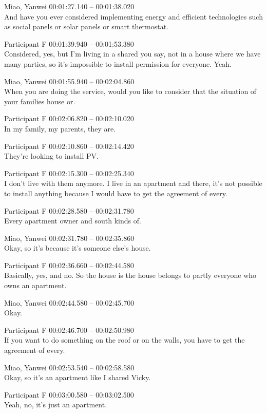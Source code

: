 {Miao, Yanwei 00:01:27.140 -- 00:01:38.020 \\
And have you ever considered implementing energy and efficient technologies such as social panels or solar panels or smart thermostat.

Participant F 00:01:39.940 -- 00:01:53.380 \\
Considered, yes, but I'm living in a shared you say, not in a house where we have many parties, so it's impossible to install permission for everyone. Yeah.

Miao, Yanwei 00:01:55.940 -- 00:02:04.860 \\
When you are doing the service, would you like to consider that the situation of your families house or.

Participant F 00:02:06.820 -- 00:02:10.020 \\
In my family, my parents, they are.

Participant F 00:02:10.860 -- 00:02:14.420 \\
They're looking to install PV.

Participant F 00:02:15.300 -- 00:02:25.340 \\
I don't live with them anymore. I live in an apartment and there, it's not possible to install anything because I would have to get the agreement of every.

Participant F 00:02:28.580 -- 00:02:31.780 \\
Every apartment owner and south kinds of.

Miao, Yanwei 00:02:31.780 -- 00:02:35.860 \\
Okay, so it's because it's someone else's house.

Participant F 00:02:36.660 -- 00:02:44.580 \\
Basically, yes, and no. So the house is the house belongs to partly everyone who owns an apartment.

Miao, Yanwei 00:02:44.580 -- 00:02:45.700 \\
Okay.

Participant F 00:02:46.700 -- 00:02:50.980 \\
If you want to do something on the roof or on the walls, you have to get the agreement of every.

Miao, Yanwei 00:02:53.540 -- 00:02:58.580 \\
Okay, so it's an apartment like I shared Vicky.

Participant F 00:03:00.580 -- 00:03:02.500 \\
Yeah, no, it's just an apartment.

}
